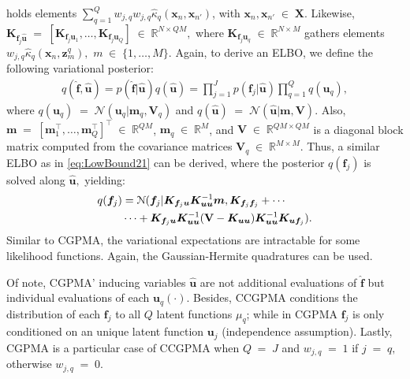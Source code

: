 \documentclass[journal]{IEEEtran}
\providecommand{\ve}[1]{{\bm{#1}}}%
\providecommand{\mat}[1]{{\bm{#1}}} %
\newcommand{\Real}{\mathbb{R}}
\DeclareMathOperator{\en}{\!\,\in\!\,}
\DeclareMathOperator{\igual}{\!\,=\!\,}
\providecommand{\ve}[1]{{\mathbf{#1}}}
\providecommand{\mat}[1]{{\mathbf{#1}}}
\newcommand{\boldV}{\mathbf{V}}
\newcommand{\gauss}{\mathcal{N}} %
\begin{document}
holds elements $\sum_{q=1}^{Q}w_{j,q}w_{j,q}\hat{\kappa}_q(\ve{x}_n,\ve{x}_{n'})$, with $\ve{x}_n,\ve{x}_{n'}\en\mat{X}$. Likewise, $\mat{K}_{\ve{f}_j\hat{\ve{u}}}\igual [\mat{K}_{\ve{f}_j\ve{u}_1}, \dots , \mat{K}_{\ve{f}_j\ve{u}_Q}]\en \Real^{N\times QM},$ where $\mat{K}_{\ve{f}_j\ve{u}_q} \en \Real^{N\times M}$ gathers elements $w_{j,q}\hat{\kappa}_q(\ve{x}_n, \ve{z}^q_m),$ $m\en\{1,\dots,M\}.$ Again, to derive an ELBO, we define the following variational posterior:
\begin{align}
q(\hat{\ve{f}}, \hat{\ve{u}}) = p(\hat{\ve{f}}|\hat{\ve{u}})q(\hat{\ve{u}})= \prod_{j=1}^{J}p(\ve{f}_j|\hat{\ve{u}})\prod_{q=1}^{Q}q(\ve{u}_q),
\end{align}
where $q(\ve{u}_q)\igual\gauss(\ve{u}_q|\ve{m}_q,\mat{V}_q)$ and $q(\hat{\ve{u}})\igual \gauss(\hat{\ve{u}}|\ve{m},\mat{V})$.  Also, $\ve{m} \igual [\ve{m}_1^{\top}, \dots , \ve{m}_Q^{\top}]^{\top}\en \Real^{QM}$, $\ve{m}_q\en\Real^{M}$, and $\mat{V}\en \Real^{QM\times QM}$ is a diagonal block matrix computed from the covariance matrices $\mat{V}_q\en \Real^{M\times M}$. Thus, a similar ELBO as in \cref{eq:LowBound21} can be derived, where the posterior $q(\ve{f}_j)$ is solved along $\hat{\ve{u}},$ yielding:
\begin{align}
\notag q(\ve{f}_j) &=\gauss(\ve{f}_j|\mat{K}_{\ve{f}_j\ve{u}}\mat{K}_{\ve{u}\ve{u}}^{-1}\ve{m}, \mat{K}_{\ve{f}_j\ve{f}_j}+\cdots\\
& \cdots + \mat{K}_{\ve{f}_j\ve{u}}\mat{K}_{\ve{u}\ve{u}}^{-1}(\boldV-\mat{K}_{\ve{u}\ve{u}})\mat{K}_{\ve{u}\ve{u}}^{-1}\mat{K}_{\ve{u}\ve{f}_j}).
\end{align}
Similar to CGPMA, the variational expectations are intractable for some likelihood functions. Again, the Gaussian-Hermite quadratures can be used.

Of note, CGPMA' inducing variables $\hat{\ve{u}}$ are not additional evaluations of $\hat{\ve{f}}$ but individual evaluations of each $\ve{u}_q(\cdot)$. Besides, CCGPMA conditions the distribution of each $\ve{f}_j$ to all $Q$ latent functions $\mu_q$; while in CGPMA $\ve{f}_j$ is only conditioned on an unique latent function $\ve{u}_j$ (independence assumption). Lastly, CGPMA is a particular case of CCGPMA when $Q\igual J$ and $w_{j,q}\igual 1$ if $j\igual q,$ otherwise $w_{j,q}\igual 0.$
\end{document}
